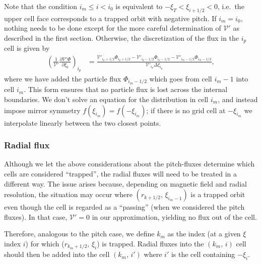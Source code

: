 \documentclass[11pt,a4paper]{article}
\newcommand{\Vp}{\ensuremath{\mathcal{V}'} }
\begin{document}
Note that the condition $i_m \leq i < i_0$ is equivalent to $- \xi_T < \xi_{i+1/2} < 0$, i.e.~the upper cell face corresponds to a trapped orbit with negative pitch.
If $i_m=i_0$, nothing needs to be done except for the more careful determination of \Vp\! as described in the first section. Otherwise, the discretization of the flux in the $i_p$ cell is given by
\begin{align}
\left(\frac{1}{\mathcal{V}'}\frac{\partial \mathcal{V}' \Phi}{\partial \xi_0} \right)_{i_p} &=  \frac{\mathcal{V}'_{i_p+1/2}\Phi_{i_p+1/2} - \mathcal{V}'_{i_p-1/2}\Phi_{i_p-1/2} - \mathcal{V}'_{i_m-1/2}\Phi_{i_m-1/2}}{\mathcal{V}'_{i_p} \Delta \xi_{i_p}}, %
\end{align}
where we have added the particle flux $\Phi_{i_m-1/2}$ which goes from cell $i_m-1$ into cell $i_m$. This form ensures that no particle flux is lost across the internal boundaries.
We don't solve an equation for the distribution in cell $i_m$, and instead impose mirror symmetry $f(\xi_{i_m}) = f(-\xi_{i_m})$; if there is no grid cell at $-\xi_{i_m}$ we interpolate linearly between the two closest points.

\subsubsection*{Radial flux}
Although we let the above considerations about the pitch-fluxes determine which cells are considered ``trapped'', the radial fluxes will need to be treated in a different way. The issue arises because, depending on magnetic field and radial resolution, the situation may occur where $(r_{k+1/2},\,\xi_{i_m-1})$ is a trapped orbit even though the cell is regarded as a ``passing'' (when we considered the pitch fluxes). In that case, $\mathcal{V}'=0$ in our approximation, yielding no flux out of the cell.

Therefore, analogous to the pitch case, we define $k_m$ as the index (at a given $\xi$ index $i$) for which ($r_{k_m+1/2},\,\xi_i$) is trapped. Radial fluxes into the $(k_m,\,i)$ cell should then be added into the cell $(k_m,\,i')$ where $i'$ is the cell containing $-\xi_i$.
\end{document}
